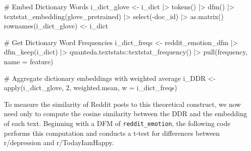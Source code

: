 \documentclass[
  man,
  floatsintext,
  longtable,
  nolmodern,
  notxfonts,
  notimes,
  colorlinks=true,linkcolor=blue,citecolor=blue,urlcolor=blue]{apa7}
\newenvironment{Shaded}{\begin{snugshade}}{\end{snugshade}}
\newcommand{\AttributeTok}[1]{\textcolor[rgb]{0.40,0.45,0.13}{#1}}
\newcommand{\CommentTok}[1]{\textcolor[rgb]{0.37,0.37,0.37}{#1}}
\newcommand{\DecValTok}[1]{\textcolor[rgb]{0.68,0.00,0.00}{#1}}
\newcommand{\FunctionTok}[1]{\textcolor[rgb]{0.28,0.35,0.67}{#1}}
\newcommand{\NormalTok}[1]{\textcolor[rgb]{0.00,0.23,0.31}{#1}}
\newcommand{\OtherTok}[1]{\textcolor[rgb]{0.00,0.23,0.31}{#1}}
\newcommand{\SpecialCharTok}[1]{\textcolor[rgb]{0.37,0.37,0.37}{#1}}
\begin{document}
\begin{Shaded}
\begin{Highlighting}[]
\CommentTok{\# Embed Dictionary Words}
\NormalTok{i\_dict\_glove }\OtherTok{\textless{}{-}}\NormalTok{ i\_dict }\SpecialCharTok{|\textgreater{}} 
  \FunctionTok{tokens}\NormalTok{() }\SpecialCharTok{|\textgreater{}} 
  \FunctionTok{dfm}\NormalTok{() }\SpecialCharTok{|\textgreater{}} 
  \FunctionTok{textstat\_embedding}\NormalTok{(glove\_pretrained) }\SpecialCharTok{|\textgreater{}} 
  \FunctionTok{select}\NormalTok{(}\SpecialCharTok{{-}}\NormalTok{doc\_id) }\SpecialCharTok{|\textgreater{}} 
  \FunctionTok{as.matrix}\NormalTok{()}
\FunctionTok{rownames}\NormalTok{(i\_dict\_glove) }\OtherTok{\textless{}{-}}\NormalTok{ i\_dict}
  
\CommentTok{\# Get Dictionary Word Frequencies}
\NormalTok{i\_dict\_freqs }\OtherTok{\textless{}{-}}\NormalTok{ reddit\_emotion\_dfm }\SpecialCharTok{|\textgreater{}} 
  \FunctionTok{dfm\_keep}\NormalTok{(i\_dict) }\SpecialCharTok{|\textgreater{}} 
\NormalTok{  quanteda.textstats}\SpecialCharTok{::}\FunctionTok{textstat\_frequency}\NormalTok{() }\SpecialCharTok{|\textgreater{}} 
  \FunctionTok{pull}\NormalTok{(frequency, }\AttributeTok{name =}\NormalTok{ feature)}
  
\CommentTok{\# Aggregate dictionary embeddings with weighted average}
\NormalTok{i\_DDR }\OtherTok{\textless{}{-}} \FunctionTok{apply}\NormalTok{(i\_dict\_glove, }\DecValTok{2}\NormalTok{, weighted.mean, }\AttributeTok{w =}\NormalTok{ i\_dict\_freqs)}
\end{Highlighting}
\end{Shaded}

To measure the similarity of Reddit posts to this theoretical construct,
we now need only to compute the cosine similarity between the DDR and
the embedding of each text. Beginning with a DFM of
\texttt{reddit\_emotion}, the following code performs this computation
and conducts a t-test for differences between r/depression and
r/TodayIamHappy.
\end{document}
